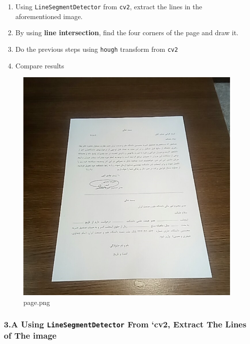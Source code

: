 \documentclass[11pt]{article}
\makeatletter
\def\maxwidth{\ifdim\Gin@nat@width>\linewidth\linewidth
    \else\Gin@nat@width\fi}
\let\Oldincludegraphics\includegraphics
\renewcommand{\includegraphics}[1]{\Oldincludegraphics[width=.8\maxwidth]{#1}}
\providecommand{\tightlist}{%
      \setlength{\itemsep}{0pt}\setlength{\parskip}{0pt}}
\makeatother
\begin{document}
\begin{enumerate}
\def\labelenumi{\arabic{enumi}.}
\tightlist
\item
  Using \texttt{LineSegmentDetector} from \texttt{cv2}, extract the
  lines in the aforementioned image.
\item
  By using \textbf{line intersection}, find the four corners of the page
  and draw it.
\item
  Do the previous steps using \texttt{hough} transform from \texttt{cv2}
\item
  Compare results
\end{enumerate}

\begin{figure}
\centering
\includegraphics{images/page.png}
\caption{page.png}
\end{figure}

    \hypertarget{a-using-linesegmentdetector-from-cv2-extract-the-lines-of-the-image}{%
\subsubsection{\texorpdfstring{3.A Using \texttt{LineSegmentDetector}
From `cv2, Extract The Lines of The
image}{3.A Using LineSegmentDetector From `cv2, Extract The Lines of The image}}\label{a-using-linesegmentdetector-from-cv2-extract-the-lines-of-the-image}}
\end{document}
